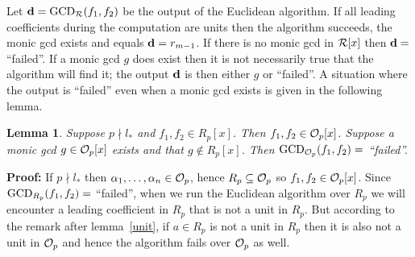 \documentclass[10pt]{article}
\newcommand{\notdivides}{\nmid}
\newtheorem{lemma}{Lemma}
\newcommand{\EuclAlg}{{\rm GCD}}
\begin{document}
Let ${\bf d} = \EuclAlg_{\cal R}(f_1,f_2)$ be the output of the Euclidean algorithm.
If all leading coefficients during the computation
are units then the algorithm succeeds, the monic gcd exists and
equals ${\bf d}=r_{m-1}$.
If there is no monic gcd in ${\cal R}[x]$
then ${\bf d}=$ ``failed''.
If a monic gcd $g$ does exist then it is not necessarily true that
the algorithm will find it; the output ${\bf d}$ is then either $g$ or ``failed''.
A situation where the output is ``failed'' even when a monic gcd exists
is given in the following lemma.
\begin{lemma}
\label{lemmaTestNotNeeded}
Suppose $p \notdivides l_*$ and $f_1,f_2 \in R_p[x]$. Then  $f_1,f_2 \in {\cal O}_p[x]$.
Suppose a monic gcd $g \in {\cal O}_p[x]$ exists and that $g \not\in R_p[x]$.
Then $\EuclAlg_{{\cal O}_p}(f_1,f_2)=$ ``failed''.
\end{lemma}
{\bf Proof:}
If $p \notdivides l_*$ then $\alpha_1,\ldots,\alpha_n \in {\cal O}_p$,
hence $R_p \subseteq {\cal O}_p$ so $f_1,f_2 \in {\cal O}_p[x]$.
Since $\EuclAlg_{R_p}(f_1,f_2) =$ ``failed'', when we run the
Euclidean algorithm over $R_p$ we will encounter a leading coefficient in $R_p$
that is not a unit in $R_p$. But according to the remark after lemma~\ref{unit},
if $a \in R_p$ is not a unit in $R_p$ then it is also not a unit in ${\cal O}_p$
and hence the algorithm fails over ${\cal O}_p$ as well.
\\
\end{document}
